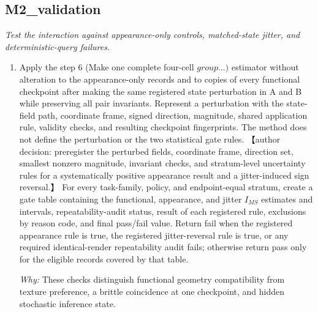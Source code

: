 \documentclass[10pt,a4paper]{article}
\begin{document}
\subsection*{M2\_validation}
\emph{Test the interaction against appearance-only controls, matched-state jitter, and deterministic-query failures.}
\begin{enumerate}[leftmargin=*,start=7]
  \item Apply the step 6 (Make one complete four-cell \(group\dots )\) estimator without alteration to the appearance-only records and to copies of every functional checkpoint after making the same registered state perturbation in A and B while preserving all pair invariants. Represent a perturbation with the state-field path, coordinate frame, signed direction, magnitude, shared application rule, validity checks, and resulting checkpoint fingerprints. The method does not define the perturbation or the two statistical gate rules. 【author decision: preregister the perturbed fields, coordinate frame, direction set, smallest nonzero magnitude, invariant checks, and stratum-level uncertainty rules for a systematically positive appearance result and a jitter-induced sign reversal.】 For every task-family, policy, and endpoint-equal stratum, create a gate table containing the functional, appearance, and jitter \(I_{MS}\) estimates and intervals, repeatability-audit status, result of each registered rule, exclusions by reason code, and final pass/fail value. Return fail when the registered appearance rule is true, the registered jitter-reversal rule is true, or any required identical-render repeatability audit fails;\allowbreak{} otherwise return pass only for the eligible records covered by that table.
\par\emph{Why:} These checks distinguish functional geometry compatibility from texture preference, a brittle coincidence at one checkpoint, and hidden stochastic inference state.
\end{enumerate}
\end{document}
